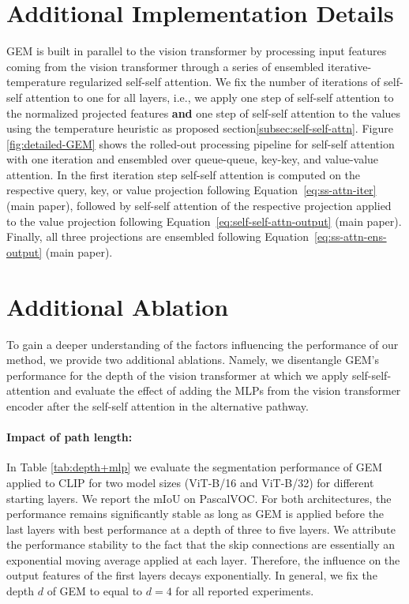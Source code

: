 \documentclass[10pt,twocolumn,letterpaper]{article}
\begin{document}
\section{Additional Implementation Details}
\label{appendix:implementation}

GEM is built in parallel to the vision transformer by processing input features coming from the vision transformer through a series of ensembled iterative-temperature regularized self-self attention. We fix the number of iterations of self-self attention to one for all layers, i.e., we apply one step of self-self attention to the normalized projected features \textbf{and} one step of self-self attention to the values using the temperature heuristic as proposed section\ref{subsec:self-self-attn}. Figure \ref{fig:detailed-GEM} shows the rolled-out processing pipeline for self-self attention with one iteration and ensembled over queue-queue, key-key, and value-value attention. In the first iteration step self-self attention is computed on the respective query, key, or value projection following Equation~\ref{eq:ss-attn-iter} (main paper), followed by self-self attention of the respective projection applied to the value projection following Equation~\ref{eq:self-self-attn-output} (main paper). Finally, all three projections are ensembled following Equation~\ref{eq:ss-attn-ens-output} (main paper).


\section{Additional Ablation}\label{appendix:ablation}
To gain a deeper understanding of the factors influencing the performance of our method, we provide two additional ablations. Namely, we disentangle GEM's performance for the depth of the vision transformer at which we apply self-self-attention and evaluate the effect of adding the MLPs from the vision transformer encoder after the self-self attention in the alternative pathway.

\paragraph{Impact of path length:}
In Table \ref{tab:depth+mlp} we evaluate the segmentation performance of GEM applied to CLIP for two model sizes (ViT-B/16 and ViT-B/32) for different starting layers. We report the mIoU on PascalVOC. For both architectures, the performance remains significantly stable as long as GEM is applied before the last layers with best performance at a depth of three to five layers. We attribute the performance stability to the fact that the skip connections are essentially an exponential moving average applied at each layer. Therefore, the influence on the output features of the first layers decays exponentially. In general, we fix the depth $d$ of GEM to equal to $d=4$ for all reported experiments.
\end{document}
